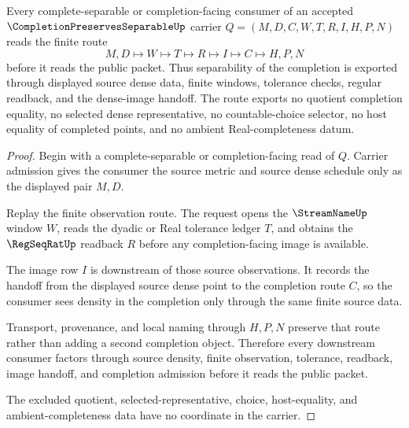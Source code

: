 \begin{theorem}\label{thm:completion-preserves-separable-dense-image-handoff}
Every complete-separable or completion-facing consumer of an accepted $\CompletionPreservesSeparableUp$ carrier $Q=(M,D,C,W,T,R,I,H,P,N)$ reads the finite route
$$
M,D \longmapsto W \longmapsto T \longmapsto R \longmapsto I \longmapsto C \longmapsto H,P,N
$$
before it reads the public packet. Thus separability of the completion is exported through displayed source dense data, finite windows, tolerance checks, regular readback, and the dense-image handoff. The route exports no quotient completion equality, no selected dense representative, no countable-choice selector, no host equality of completed points, and no ambient Real-completeness datum.
\end{theorem}
\begin{proof}
Begin with a complete-separable or completion-facing read of $Q$. Carrier admission gives the consumer the source metric and source dense schedule only as the displayed pair $M,D$.

Replay the finite observation route. The request opens the $\StreamNameUp$ window $W$, reads the dyadic or Real tolerance ledger $T$, and obtains the $\RegSeqRatUp$ readback $R$ before any completion-facing image is available.

The image row $I$ is downstream of those source observations. It records the handoff from the displayed source dense point to the completion route $C$, so the consumer sees density in the completion only through the same finite source data.

Transport, provenance, and local naming through $H,P,N$ preserve that route rather than adding a second completion object. Therefore every downstream consumer factors through source density, finite observation, tolerance, readback, image handoff, and completion admission before it reads the public packet.

The excluded quotient, selected-representative, choice, host-equality, and ambient-completeness data have no coordinate in the carrier.
\end{proof}

